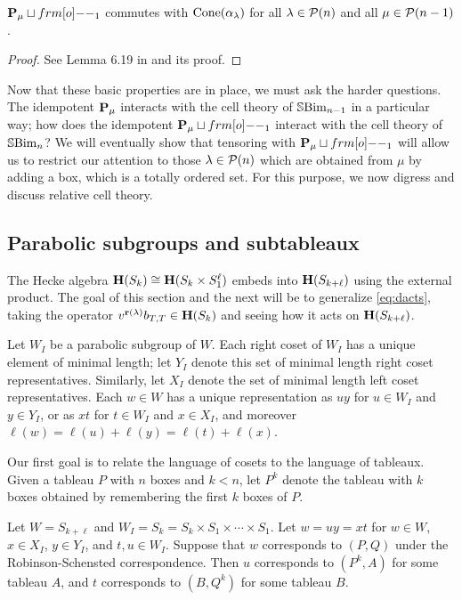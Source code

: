 \begin{corollary} \label{cor:projectorconecommute}
$\PB_{\mu}\sqcup \one_1$ commutes with $\operatorname{Cone}(\alpha_\lambda)$ for all $\lambda \in {\mathcal{P}}(n)$ and all $\mu \in {\mathcal{P}}(n-1)$.
\end{corollary}
\begin{proof}
See Lemma 6.19 in \cite{ElHog17a} and its proof.
\end{proof}

Now that these basic properties are in place, we must ask the harder questions. The idempotent ${\mathbf P}_\mu$ interacts with the cell theory of ${\mathbb{S}}{\rm Bim }_{n-1}$ in a particular way; how does the
idempotent $\PB_\mu \sqcup \one_1$ interact with the cell theory of ${\mathbb{S}}{\rm Bim }_n$? We will eventually show that tensoring with $\PB_\mu \sqcup \one_1$ will allow us to restrict our attention
to those $\lambda \in {\mathcal{P}}(n)$ which are obtained from $\mu$ by adding a box, which is a totally ordered set. For this purpose, we now digress and discuss relative cell theory.

\subsection{Parabolic subgroups and subtableaux}
\label{subsec:subtableaux}

The Hecke algebra ${\mathbf H}(S_k)\cong {\mathbf H}(S_k\times S_1^{\ell})$ embeds into ${\mathbf H}(S_{k+\ell})$ using the external product. The goal of this section and the next will be to generalize \eqref{eq:dacts}, taking the operator $v^{\mathbf{r}(\lambda)} b_{T,T} \in {\mathbf H}(S_k)$ and seeing how it acts on ${\mathbf H}(S_{k+\ell})$.

Let $W_I$ be a parabolic subgroup of $W$. Each right coset of $W_I$ has a unique element of minimal length; let $Y_I$ denote this set of minimal length right coset representatives.
Similarly, let $X_I$ denote the set of minimal length left coset representatives. Each $w \in W$ has a unique representation as $uy$ for $u \in W_I$ and $y \in Y_I$, or as $xt$ for $t
\in W_I$ and $x \in X_I$, and moreover $\ell(w) = \ell(u) + \ell(y) = \ell(t) + \ell(x)$.

Our first goal is to relate the language of cosets to the language of tableaux. Given a tableau $P$ with $n$ boxes and $k<n$, let $P^k$ denote the tableau with $k$ boxes obtained by
remembering the first $k$ boxes of $P$.

\begin{lemma} \label{lem:cosetvtab} Let $W = S_{k+\ell}$ and $W_I = S_k=S_k\times S_1\times \cdots \times S_1$. Let $w = uy = xt$ for $w \in W$, $x \in X_I$, $y \in Y_I$, and $t, u \in W_I$. Suppose that $w$ corresponds to
$(P,Q)$ under the Robinson-Schensted correspondence. Then $u$ corresponds to $(P^k,A)$ for some tableau $A$, and $t$ corresponds to $(B,Q^k)$ for some tableau $B$. \end{lemma}

